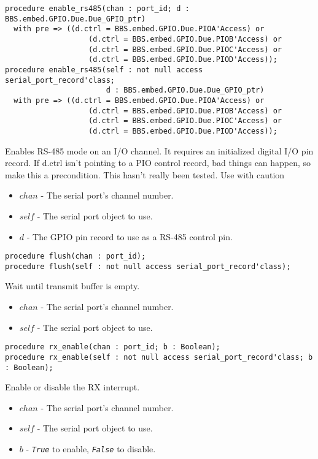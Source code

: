 \documentclass[10pt, openany]{book}
\newcommand{\indexfunc}[1]{\index[func]{#1}}
\newcommand{\constant}[1]{\emph{\texttt{#1}}}
\begin{document}
\begin{lstlisting}
procedure enable_rs485(chan : port_id; d : BBS.embed.GPIO.Due.Due_GPIO_ptr)
  with pre => ((d.ctrl = BBS.embed.GPIO.Due.PIOA'Access) or
                   (d.ctrl = BBS.embed.GPIO.Due.PIOB'Access) or
                   (d.ctrl = BBS.embed.GPIO.Due.PIOC'Access) or
                   (d.ctrl = BBS.embed.GPIO.Due.PIOD'Access));
procedure enable_rs485(self : not null access serial_port_record'class;
                       d : BBS.embed.GPIO.Due.Due_GPIO_ptr)
  with pre => ((d.ctrl = BBS.embed.GPIO.Due.PIOA'Access) or
                   (d.ctrl = BBS.embed.GPIO.Due.PIOB'Access) or
                   (d.ctrl = BBS.embed.GPIO.Due.PIOC'Access) or
                   (d.ctrl = BBS.embed.GPIO.Due.PIOD'Access));
\end{lstlisting}
\indexfunc{enable\_rs485}
Enables RS-485 mode on an I/O channel.  It requires an initialized digital I/O pin record.  If d.ctrl isn't pointing to a PIO control record, bad things can happen, so make this a precondition.  This hasn't really been tested.  Use with caution
\begin{itemize}
  \item $chan$ - The serial port's channel number.
  \item $self$ - The serial port object to use.
  \item $d$ - The GPIO pin record to use as a RS-485 control pin.
\end{itemize}

\begin{lstlisting}
procedure flush(chan : port_id);
procedure flush(self : not null access serial_port_record'class);
\end{lstlisting}
\indexfunc{flush}
Wait until transmit buffer is empty.
\begin{itemize}
  \item $chan$ - The serial port's channel number.
  \item $self$ - The serial port object to use.
\end{itemize}

\begin{lstlisting}
procedure rx_enable(chan : port_id; b : Boolean);
procedure rx_enable(self : not null access serial_port_record'class; b : Boolean);
\end{lstlisting}
\indexfunc{rx\_enable}
Enable or disable the RX interrupt.
\begin{itemize}
  \item $chan$ - The serial port's channel number.
  \item $self$ - The serial port object to use.
  \item $b$ - \constant{True} to enable, \constant{False} to disable.
\end{itemize}
\end{document}
